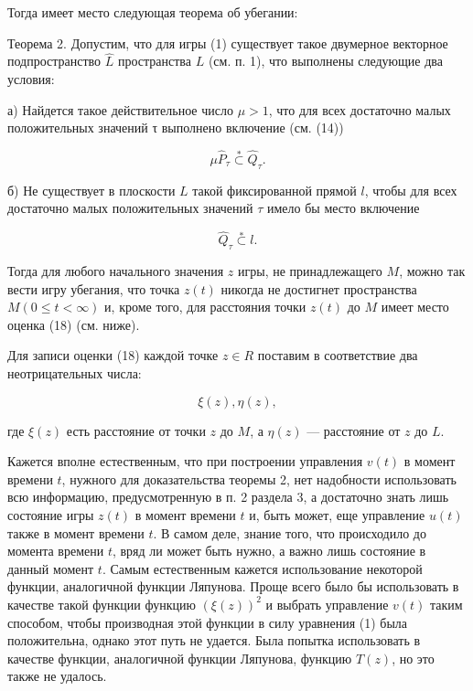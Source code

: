 \documentclass[10pt]{article}
\begin{document}
Тогда имеет место следующая теорема об убегании:

Теорема 2. Допустим, что для игры (1) существует такое двумерное векторное подпространство \(\widehat{L}\) пространства \(L\) (см. п. 1), что выполнены следующие два условия:

а) Найдется такое действительное число \(\mu > 1\), что для всех достаточно малых положительных значений τ выполнено включение (см. (14))

\[
\mu {\widehat{P}}_{\tau }\overset{ * }{ \subset  }{\widehat{Q}}_{\tau }. \tag{15}
\]

б) Не существует в плоскости \(L\) такой фиксированной прямой \(l\), чтобы для всех достаточно малых положительных значений \(\tau\) имело бы место включение

\[
{\widehat{Q}}_{\tau }\overset{ * }{ \subset  }l. \tag{16}
\]

Тогда для любого начального значения \(z\) игры, не принадлежащего \(M\), можно так вести игру убегания, что точка \(z\left( t\right)\) никогда не достигнет пространства \(M\left( {0 \leq  t < \infty }\right)\) и, кроме того, для расстояния точки \(z\left( t\right)\) до \(M\) имеет место оценка (18) (см. ниже).

Для записи оценки (18) каждой точке \(z \in  R\) поставим в соответствие два неотрицательных числа:

\[
\xi \left( z\right),\eta \left( z\right),
\]

где \(\xi \left( z\right)\) есть расстояние от точки \(z\) до \(M\), а \(\eta \left( z\right)\) — расстояние от \(z\) до \(L\).

Кажется вполне естественным, что при построении управления \(v\left( t\right)\) в момент времени \(t\), нужного для доказательства теоремы 2, нет надобности использовать всю информацию, предусмотренную в п. 2 раздела 3, а достаточно знать лишь состояние игры \(z\left( t\right)\) в момент времени \(t\) и, быть может, еще управление \(u\left( t\right)\) также в момент времени \(t\). В самом деле, знание того, что происходило до момента времени \(t\), вряд ли может быть нужно, а важно лишь состояние в данный момент \(t\). Самым естественным кажется использование некоторой функции, аналогичной функции Ляпунова. Проще всего было бы использовать в качестве такой функции функцию \({\left( \xi \left( z\right) \right) }^{2}\) и выбрать управление \(v\left( t\right)\) таким способом, чтобы производная этой функции в силу уравнения (1) была положительна, однако этот путь не удается. Была попытка использовать в качестве функции, аналогичной функции Ляпунова, функцию \(T\left( z\right)\), но это также не удалось.
\end{document}

